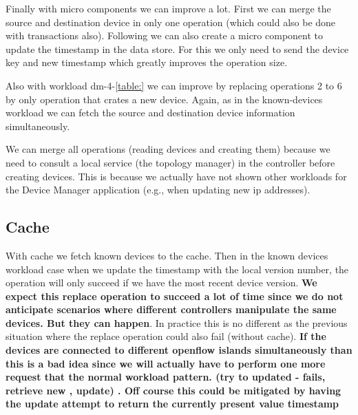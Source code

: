 Finally with micro components we can improve a lot. First we can
merge the source and destination device in only one operation (which
could also be done with transactions also). Following we can also
create a micro component to update the timestamp in the data
store. For this we only need to send the device key and new
timestamp which greatly improves the operation size.  

Also with workload dm-4-\ref{table:} we can improve by replacing
operations 2 to 6 by only operation that crates a new device. Again,
as in the known-devices workload we can fetch the source and
destination device information simultaneously. 

We can merge all operations (reading devices and creating them)
because we need to consult a local service (the topology manager) in
the controller before creating devices.  This is because we actually
have not shown other workloads for the Device Manager application
(e.g., when updating new \gls{ip} addresses). 



\subsection{Cache}
With cache we fetch known devices to the cache. Then in the known
devices workload case when we update the timestamp with the local version
number, the operation will only succeed if we have the most recent
device version.  \textbf{We expect this replace operation to succeed a lot of
time since we do not anticipate scenarios where different controllers
manipulate the same devices. But they can happen}. In practice this is
no different as the previous situation where the replace operation
could also fail (without cache). \textbf{If the devices are connected to different openflow
islands simultaneously than this is a bad idea since we will actually
have to perform one more request that the normal workload
pattern. (try to updated - fails, retrieve new , update) . Off course
this could be mitigated by having the update attempt to return the
currently present value timestamp}



